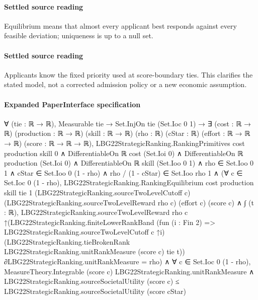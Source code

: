 \documentclass[10pt]{article}
\begin{document}
\paragraph{Settled source reading}
\begin{sloppypar}
Equilibrium means that almost every applicant best responds against every feasible deviation;\allowbreak{} uniqueness is up to a null set.\allowbreak{}
\end{sloppypar}
\paragraph{Settled source reading}
\begin{sloppypar}
Applicants know the fixed priority used at score-\allowbreak{}boundary ties.\allowbreak{} This clarifies the stated model, not a corrected admission policy or a new economic assumption.\allowbreak{}
\end{sloppypar}

\paragraph{Expanded PaperInterface specification}
\begin{ReviewVerbatim}
∀ (tie : ℝ → ℝ),
  Measurable tie →
    Set.InjOn tie (Set.Ioc 0 1) →
      ∃ (cost : ℝ → ℝ) (production : ℝ → ℝ) (skill : ℝ → ℝ) (rho : ℝ) (cStar : ℝ) (effort : ℝ → ℝ → ℝ) (score :
        ℝ → ℝ → ℝ),
        LBG22StrategicRanking.RankingPrimitives cost production skill 0 ∧
          DifferentiableOn ℝ cost (Set.Ioi 0) ∧
            DifferentiableOn ℝ production (Set.Ioi 0) ∧
              DifferentiableOn ℝ skill (Set.Ioo 0 1) ∧
                rho ∈ Set.Ioo 0 1 ∧
                  cStar ∈ Set.Ioo 0 (1 - rho) ∧
                    rho / (1 - cStar) ∈ Set.Ioo rho 1 ∧
                      (∀ c ∈ Set.Ioc 0 (1 - rho),
                          LBG22StrategicRanking.RankingEquilibrium cost production skill tie 1
                              (LBG22StrategicRanking.sourceTwoLevelCutoff c)
                              (LBG22StrategicRanking.sourceTwoLevelReward rho c) (effort c) (score c) ∧
                            ∫ (t : ℝ),
                                LBG22StrategicRanking.sourceTwoLevelReward rho c
                                  ↑(LBG22StrategicRanking.finiteLowerRankBand
                                      (fun (i : Fin 2) => LBG22StrategicRanking.sourceTwoLevelCutoff c ↑i)
                                      (LBG22StrategicRanking.tieBrokenRank LBG22StrategicRanking.unitRankMeasure
                                        (score c) tie t)) ∂LBG22StrategicRanking.unitRankMeasure =
                              rho) ∧
                        ∀ c ∈ Set.Ioc 0 (1 - rho),
                          MeasureTheory.Integrable (score c) LBG22StrategicRanking.unitRankMeasure ∧
                            LBG22StrategicRanking.sourceSocietalUtility (score c) ≤
                              LBG22StrategicRanking.sourceSocietalUtility (score cStar)
\end{ReviewVerbatim}
\end{document}
